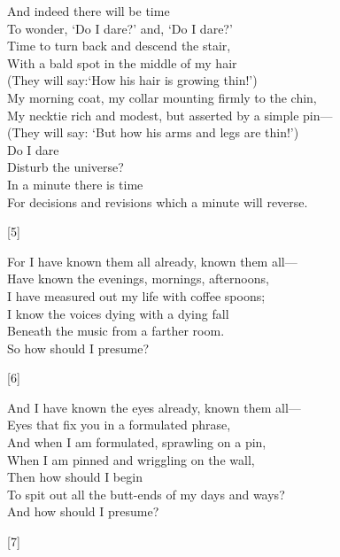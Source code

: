 \documentclass[twoside]{article}
\newcommand\tab[1][1cm]{\hspace*{#1}}
\begin{document}
\begin{multicols}{2}

\begin{minipage}{10cm}
\begin{flushleft}
    \doublespacing
    And indeed there will be time\\
    To wonder, `Do I dare?' and, `Do I dare?'\\
    Time to turn back and descend the stair,\\
    With a bald spot in the middle of my hair\\
    (They will say:`How his hair is growing thin!')\\
    My morning coat, my collar mounting firmly to the chin,\\
    My necktie rich and modest, but asserted by a simple pin---\\
    (They will say: `But how his arms and legs are thin!')\\
    Do I dare\\
    Disturb the universe?\\
    In a minute there is time\\
    For decisions and revisions which a minute will reverse.
    \begin{center}[5]\end{center}
\end{flushleft}
\end{minipage}

\begin{minipage}{9cm}
\begin{flushright}
    \doublespacing
    For I have known them all already, known them all---\\
    Have known the evenings, mornings, afternoons,\\
    I have measured out my life with coffee spoons;\\
    I know the voices dying with a dying fall\\
    Beneath the music from a farther room.\\
    So how should I presume?\tab{}
    \begin{center}[6]\end{center}
\end{flushright}

\begin{minipage}{8cm}
    \doublespacing
    And I have known the eyes already, known them all---\\
    Eyes that fix you in a formulated phrase,\\
    And when I am formulated, sprawling on a pin,\\
    When I am pinned and wriggling on the wall,\\
    Then how should I begin\\
    To spit out all the butt-ends of my days and ways?\\
    \tab{}And how should I presume?
    \begin{center}[7]\end{center}
\end{minipage}


\end{minipage}
\end{multicols}
\end{document}
